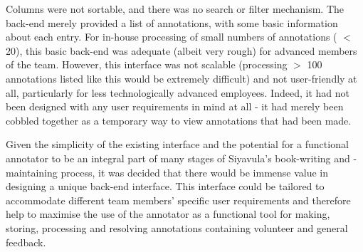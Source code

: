 Columns were not sortable, and there was no search or filter mechanism. The back-end merely provided a list of annotations, with some basic information about each entry. For in-house processing of small numbers of annotations ( $<$ 20), this basic back-end was adequate (albeit  very rough) for advanced members of the team. However, this interface was not scalable (processing $>$ 100 annotations listed like this would be extremely difficult) and not user-friendly at all, particularly for less technologically advanced employees. Indeed, it had not been designed with any user requirements in mind at all - it had merely been cobbled together as a temporary way to view annotations that had been made.

Given the simplicity of the existing interface and the potential for a functional annotator to be an integral part of many stages of Siyavula's book-writing and -maintaining process, it was decided that there would be immense value in designing a unique back-end interface. This interface could be tailored to accommodate different team members' specific user requirements and therefore help to maximise the use of the annotator as a functional tool for making, storing, processing and resolving annotations containing volunteer and general feedback.
